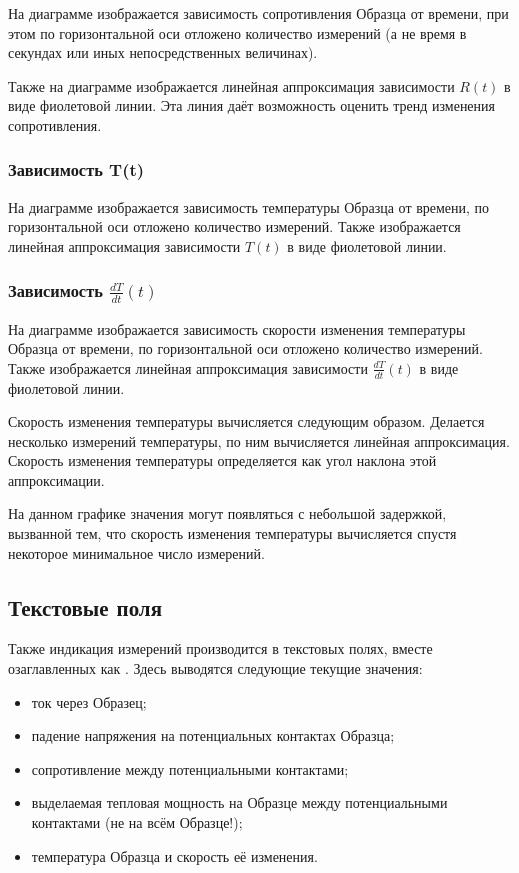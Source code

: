 \documentclass[12pt, a4paper, twocolumn]{report}
\begin{document}
На диаграмме изображается зависимость сопротивления Образца от времени, при этом по горизонтальной оси отложено количество измерений (а не время в секундах или иных непосредственных величинах).

Также на диаграмме изображается линейная аппроксимация зависимости $R(t)$ в виде фиолетовой линии. Эта линия даёт возможность оценить тренд изменения сопротивления.

\subsubsection{Зависимость T(t)}

На диаграмме изображается зависимость температуры Образца от времени, по горизонтальной оси отложено количество измерений. Также изображается линейная аппроксимация зависимости $T(t)$ в виде фиолетовой линии.

\subsubsection{Зависимость $\frac{dT}{dt}(t)$}

На диаграмме изображается зависимость скорости изменения температуры Образца от времени, по горизонтальной оси отложено количество измерений. Также изображается линейная аппроксимация зависимости $\frac{dT}{dt}(t)$ в виде фиолетовой линии.

Скорость изменения температуры вычисляется следующим образом. Делается несколько измерений температуры, по ним вычисляется линейная аппроксимация. Скорость изменения температуры определяется как угол наклона этой аппроксимации.

На данном графике значения могут появляться с небольшой задержкой, вызванной тем, что скорость изменения температуры вычисляется спустя некоторое минимальное число измерений.

\subsection{Текстовые поля}

Также индикация измерений производится в текстовых полях, вместе озаглавленных как . Здесь выводятся следующие текущие значения:

\begin{itemize}
\item ток через Образец;
\item падение напряжения на потенциальных контактах Образца;
\item сопротивление между потенциальными контактами;
\item выделаемая тепловая мощность на Образце между потенциальными контактами (не на всём Образце!);
\item температура Образца и скорость её изменения.
\end{itemize}
\end{document}
